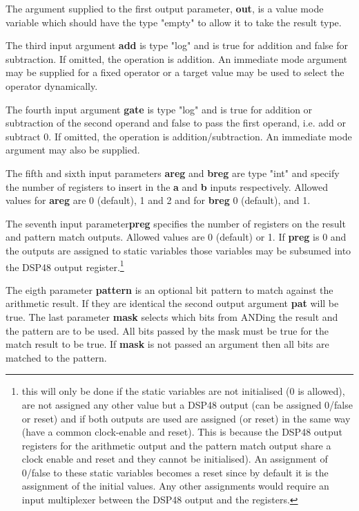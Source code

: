             The argument supplied to the first output parameter, {\bf out}, is a
            value mode variable which should have the type "empty" to allow it
            to take the result type.

            The third input argument {\bf add} is type "log" and is true for
            addition and false for subtraction. If omitted, the operation is
            addition. An immediate mode argument may be supplied for a
            fixed operator or a target value may be used to select the
            operator dynamically.

            The fourth input argument {\bf gate} is type "log" and is true for
            addition or subtraction of the second operand and false to pass the
            first operand, i.e. add or subtract 0. If omitted, the operation is
            addition/subtraction. An immediate mode argument may also be
            supplied.

            The fifth and sixth input parameters {\bf areg} and {\bf breg} 
            are type "int" and specify the number of registers to insert
            in the {\bf a} and {\bf b} inputs respectively. Allowed
            values for {\bf areg} are 0 (default), 1 and 2 and for
            {\bf breg} 0 (default), and 1.

            The seventh input parameter{\bf preg} specifies the number of
            registers on the result and pattern match outputs. Allowed values
            are 0 (default) or 1. If {\bf preg} is 0 and the outputs are
            assigned to static variables those variables may be subsumed into
            the DSP48 output register.\footnote{this will only be done if the
            static variables are not initialised (0 is allowed), are not
            assigned any other value but a DSP48 output (can be assigned 0/false
            or reset) and if both outputs are used are assigned (or reset) in
            the same way (have a common clock-enable and reset). This is because
            the DSP48 output registers for the arithmetic output and
            the pattern match output share a clock enable and reset and they
            cannot be initialised). An assignment of 0/false to these static
            variables becomes a reset since by default it is the assignment of
            the initial values. Any other assignments would require an input
            multiplexer between the DSP48 output and the registers.}

            The eigth parameter {\bf pattern} is an optional bit pattern to
            match against the arithmetic result. If they are identical the
            second output argument {\bf pat} will be true. The last parameter
            {\bf mask} selects which bits from ANDing the result and the pattern
            are to be used. All bits passed by the mask must be true for the
            match result to be true. If {\bf mask} is not passed an argument
            then all bits are matched to the pattern.


